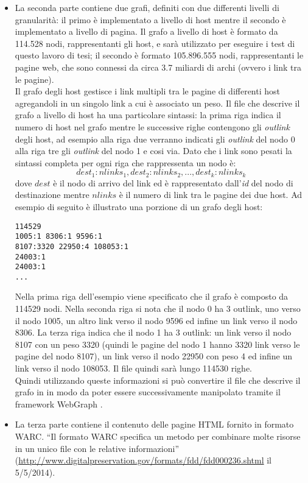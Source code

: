 \begin{itemize}
 
 \item La seconda parte contiene due grafi, definiti con due differenti livelli di granularità: il primo è implementato a livello di host mentre il secondo è implementato a livello di pagina. Il grafo a livello di host  è formato da 114.528 nodi, rappresentanti gli host, e sarà utilizzato per eseguire i test di questo lavoro di tesi; il secondo è formato  105.896.555 nodi, rappresentanti le pagine web, che sono  connessi da circa 3.7 miliardi di archi (ovvero i link tra le pagine).\\
 Il grafo degli host gestisce i link multipli tra le pagine di differenti host agregandoli in un singolo link a cui è associato un peso. Il file che descrive il grafo a livello di host ha una particolare sintassi: la prima riga indica il numero di host nel grafo mentre le successive righe contengono gli \textit{outlink} degli host, ad esempio alla riga due verranno indicati gli \textit{outlink} del nodo 0 alla riga tre gli \textit{outlink} del nodo 1 e cosi via. Dato che i link sono pesati la sintassi completa per ogni riga che rappressenta un nodo è:
 $$
 dest_1:nlinks_1,dest_2:nlinks_2,...,dest_k:nlinks_k
 $$
 dove \(dest\) è il nodo di arrivo del link ed è rappresentato dall'\textit{id} del nodo di destinazione mentre \(nlinks\) è il numero di link tra le pagine dei due host.
 Ad esempio di seguito è illustrato una porzione di un grafo degli host:
\begin{lstlisting}[frame=trbl,postbreak=\space, breakindent=5pt, breaklines]
114529
1005:1 8306:1 9596:1 
8107:3320 22950:4 108053:1
24003:1
24003:1
...
\end{lstlisting}
Nella prima riga dell'esempio viene specificato che il grafo è composto da 114529 nodi. Nella seconda riga si nota che il nodo 0 ha 3 outlink, uno verso il nodo 1005, un altro link verso il nodo 9596 ed infine un link verso il nodo 8306. La terza riga indica che il nodo 1 ha 3 outlink: un link verso il nodo 8107 con un peso 3320 (quindi le pagine del nodo 1 hanno 3320 link verso le pagine del nodo 8107), un link verso il nodo 22950 con peso 4 ed infine un link verso il nodo 108053. Il file quindi sarà lungo 114530 righe.\\
Quindi utilizzando queste informazioni si può convertire il file che descrive il grafo in  in modo da poter essere successivamente manipolato tramite il framework WebGraph \cite{Boldi03thewebgraph}.
\item La terza parte contiene il contenuto delle pagine HTML fornito in formato WARC. ``Il formato WARC specifica un metodo per combinare molte risorse in un unico file con le relative informazioni'' (\url{http://www.digitalpreservation.gov/formats/fdd/fdd000236.shtml} il 5/5/2014).
\end{itemize}

